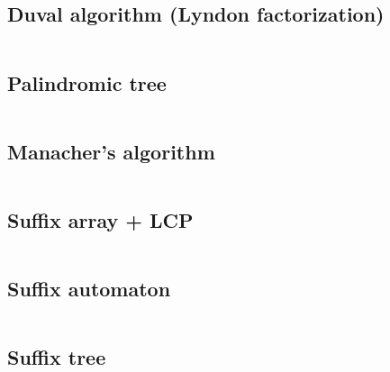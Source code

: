 \documentclass{article}
\begin{document}
\subsection{Duval algorithm (Lyndon factorization)}
\inputminted[mathescape, breaklines, breakafter=(, tabsize=2, frame=lines, showtabs, tab=|\ , tabcolor=lightgray]{c++}{./strings/duval/duval.cpp}
\subsection{Palindromic tree}
\inputminted[mathescape, breaklines, breakafter=(, tabsize=2, frame=lines, showtabs, tab=|\ , tabcolor=lightgray]{c++}{./strings/eertree/eertree.cpp}
\subsection{Manacher's algorithm}
\inputminted[mathescape, breaklines, breakafter=(, tabsize=2, frame=lines, showtabs, tab=|\ , tabcolor=lightgray]{c++}{./strings/manacher/manacher.cpp}
\subsection{Suffix array + LCP}
\inputminted[mathescape, breaklines, breakafter=(, tabsize=2, frame=lines, showtabs, tab=|\ , tabcolor=lightgray]{c++}{./strings/suff-array/suff-array.cpp}
\subsection{Suffix automaton}
\inputminted[mathescape, breaklines, breakafter=(, tabsize=2, frame=lines, showtabs, tab=|\ , tabcolor=lightgray]{c++}{./strings/suff-automaton/suff-automaton.cpp}
\subsection{Suffix tree}
\inputminted[mathescape, breaklines, breakafter=(, tabsize=2, frame=lines, showtabs, tab=|\ , tabcolor=lightgray]{c++}{./strings/suff-tree/suff-tree.cpp}


\onecolumn



\end{document}

